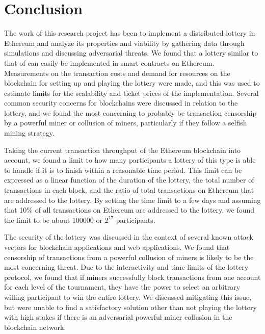\chapter{Conclusion}
\label{chap:conclusion}


The work of this research project has been to implement a distributed lottery in Ethereum and analyze its properties and viability by gathering data through simulations and discussing adversarial threats. We found that a lottery similar to that of \cite{miller_zero-collateral_2017} can easily be implemented in smart contracts on Ethereum. Measurements on the transaction costs and demand for resources on the blockchain for setting up and playing the lottery were made, and this was used to estimate limits for the scalability and ticket prices of the implementation. Several common security concerns for blockchains were discussed in relation to the lottery, and we found the most concerning to probably be transaction censorship by a powerful miner or collusion of miners, particularly if they follow a selfish mining strategy.

Taking the current transaction throughput of the Ethereum blockchain into account, we found a limit to how many participants a lottery of this type is able to handle if it is to finish within a reasonable time period. This limit can be expressed as a linear function of the duration of the lottery, the total number of transactions in each block, and the ratio of total transactions on Ethereum that are addressed to the lottery. By setting the time limit to a few days and assuming that 10\% of all transactions on Ethereum are addressed to the lottery, we found the limit to be about 100000 or $2^{17}$ participants.

The security of the lottery was discussed in the context of several known attack vectors for blockchain applications and web applications. We found that censorship of transactions from a powerful collusion of miners is likely to be the most concerning threat. Due to the interactivity and time limits of the lottery protocol, we found that if miners successfully block transactions from one account for each level of the tournament, they have the power to select an arbitrary willing participant to win the entire lottery.
We discussed mitigating this issue, but were unable to find a satisfactory solution other than not playing the lottery with high stakes if there is an adversarial powerful miner collusion in the blockchain network. 

